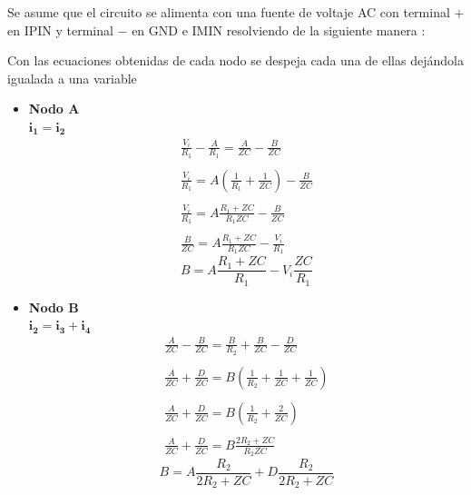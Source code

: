 Se asume que el circuito se alimenta con una fuente de voltaje AC con terminal $+$ en IPIN y terminal $-$ en GND e IMIN resolviendo de la siguiente manera :
\\  
\begin{equation}\label{Nodo D}
\end{equation}

Con las ecuaciones obtenidas de cada nodo se despeja cada una de ellas dejándola igualada a una variable 
\begin{itemize}
    \item \textbf{Nodo A} \\
    $\mathbf{i_{1}=i_{2}}$
    \begin{align*}
        \frac{V_{i}}{R_{1}} - \frac{A}{R_{1}} = \frac{A}{ZC} - \frac{B}{ZC} \\\\
        \frac{V_{i}}{R_{1}} = A(\frac{1}{R_{1}}+\frac{1}{ZC}) -\frac{B}{ZC} \\\\
        \frac{V_{i}}{R_{1}} = A\frac{R_{1}+ZC}{R_{1}ZC} -\frac{B}{ZC} \\\\
            \frac{B}{ZC} = A\frac{R_{1}+ZC}{R_{1}ZC} - \frac{V_{i}}{R_{1}}
        \end{align*}
        \begin{equation}\label{Nodo A}
            B = A\frac{R_{1}+ZC}{R_{1}} - V_{i}\frac{ZC}{R_{1}}
        \end{equation}
        \item \textbf{Nodo B} \\
        $ \mathbf{i_{2}=i_{3}+i_{4}}$
        \begin{align*}
            \frac{A}{ZC} - \frac{B}{ZC} = \frac{B}{R_{2}} + \frac{B}{ZC} - \frac{D}{ZC} \\\\
            \frac{A}{ZC} + \frac{D}{ZC} = B(\frac{1}{R_{2}} + \frac{1}{ZC} + \frac{1}{ZC}) \\\\
            \frac{A}{ZC} + \frac{D}{ZC} = B(\frac{1}{R_{2}} + \frac{2}{ZC} ) \\\\
            \frac{A}{ZC} + \frac{D}{ZC} = B\frac{2R_{2}+ZC}{R_{2}ZC} 
        \end{align*}
        \begin{equation}\label{Nodo B}
            B = A\frac{R_{2}}{2R_{2}+ZC} + D\frac{R_{2}}{2R_{2}+ZC}
        \end{equation}

\end{itemize}
